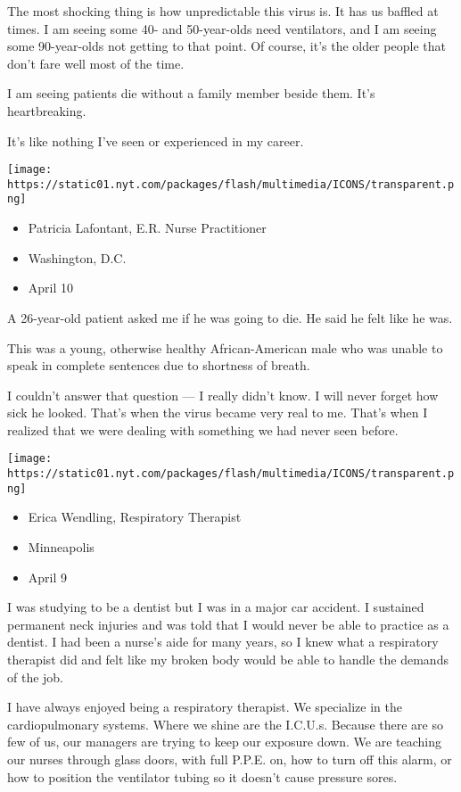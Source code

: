 The most shocking thing is how unpredictable this virus is. It has us
baffled at times. I am seeing some 40- and 50-year-olds need
ventilators, and I am seeing some 90-year-olds not getting to that
point. Of course, it's the older people that don't fare well most of the
time.

I am seeing patients die without a family member beside them. It's
heartbreaking.

It's like nothing I've seen or experienced in my career.

\texttt{[image: https://static01.nyt.com/packages/flash/multimedia/ICONS/transparent.png]}

\begin{itemize}
\tightlist
\item
  Patricia Lafontant, E.R. Nurse Practitioner
\item
  Washington, D.C.
\item
  April 10
\end{itemize}

A 26-year-old patient asked me if he was going to die. He said he felt
like he was.

This was a young, otherwise healthy African-American male who was unable
to speak in complete sentences due to shortness of breath.

I couldn't answer that question --- I really didn't know. I will never
forget how sick he looked. That's when the virus became very real to me.
That's when I realized that we were dealing with something we had never
seen before.

\texttt{[image: https://static01.nyt.com/packages/flash/multimedia/ICONS/transparent.png]}

\begin{itemize}
\tightlist
\item
  Erica Wendling, Respiratory Therapist
\item
  Minneapolis
\item
  April 9
\end{itemize}

I was studying to be a dentist but I was in a major car accident. I
sustained permanent neck injuries and was told that I would never be
able to practice as a dentist. I had been a nurse's aide for many years,
so I knew what a respiratory therapist did and felt like my broken body
would be able to handle the demands of the job.

I have always enjoyed being a respiratory therapist. We specialize in
the cardiopulmonary systems. Where we shine are the I.C.U.s. Because
there are so few of us, our managers are trying to keep our exposure
down. We are teaching our nurses through glass doors, with full P.P.E.
on, how to turn off this alarm, or how to position the ventilator tubing
so it doesn't cause pressure sores.

